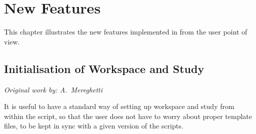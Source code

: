 \chapter{New Features} \label{NewFeatures}
This chapter illustrates the new features implemented in \SIXDESK{} from
the user point of view.

\section{Initialisation of Workspace and Study} \label{Initialisation}
\begin{flushright}
\emph{Original work by: A.~Mereghetti}
\end{flushright}
It is useful to have a standard way of setting up workspace and study
from within the \SIXDESK{} script, so that the user does not have to
worry about proper template files, to be kept in sync with a given
version of the scripts.

